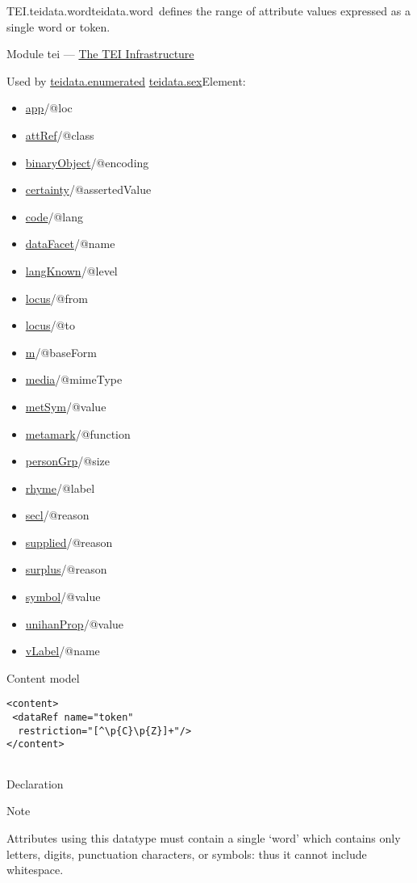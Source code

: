 \begin{reflist}
\item[]\begin{specHead}{TEI.teidata.word}{teidata.word} defines the range of attribute values expressed as a single word or token.\end{specHead} 
    \item[{Module}]
  tei — \hyperref[ST]{The TEI Infrastructure}
    \item[{Used by}]
  \hyperref[TEI.teidata.enumerated]{teidata.enumerated} \hyperref[TEI.teidata.sex]{teidata.sex}Element: \begin{itemize}
\item \hyperref[TEI.app]{app}/@loc
\item \hyperref[TEI.attRef]{attRef}/@class
\item \hyperref[TEI.binaryObject]{binaryObject}/@encoding
\item \hyperref[TEI.certainty]{certainty}/@assertedValue
\item \hyperref[TEI.code]{code}/@lang
\item \hyperref[TEI.dataFacet]{dataFacet}/@name
\item \hyperref[TEI.langKnown]{langKnown}/@level
\item \hyperref[TEI.locus]{locus}/@from
\item \hyperref[TEI.locus]{locus}/@to
\item \hyperref[TEI.m]{m}/@baseForm
\item \hyperref[TEI.media]{media}/@mimeType
\item \hyperref[TEI.metSym]{metSym}/@value
\item \hyperref[TEI.metamark]{metamark}/@function
\item \hyperref[TEI.personGrp]{personGrp}/@size
\item \hyperref[TEI.rhyme]{rhyme}/@label
\item \hyperref[TEI.secl]{secl}/@reason
\item \hyperref[TEI.supplied]{supplied}/@reason
\item \hyperref[TEI.surplus]{surplus}/@reason
\item \hyperref[TEI.symbol]{symbol}/@value
\item \hyperref[TEI.unihanProp]{unihanProp}/@value
\item \hyperref[TEI.vLabel]{vLabel}/@name
\end{itemize} 
    \item[{Content model}]
  \mbox{}\hfill\\[-10pt]\begin{Verbatim}[fontsize=\small]
<content>
 <dataRef name="token"
  restriction="[^\p{C}\p{Z}]+"/>
</content>
    
\end{Verbatim}

    \item[{Declaration}]
    \item[{Note}]
  \par
Attributes using this datatype must contain a single ‘word’ which contains only letters, digits, punctuation characters, or symbols: thus it cannot include whitespace.
\end{reflist}  
